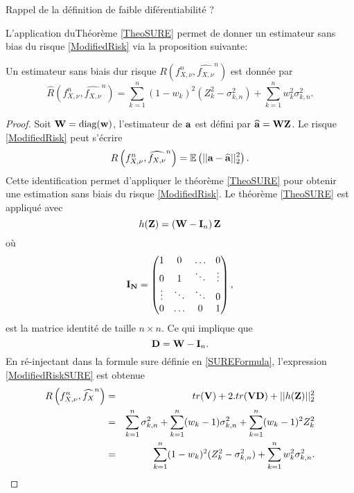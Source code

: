 \begin{Def}
Rappel de la définition de faible diférentiabilité ?
\end{Def}
L\rq{}application duThéorème \ref{TheoSURE} permet de donner un estimateur sans bias du risque \eqref{ModifiedRisk} via la proposition suivante:
\begin{Prop}\label{PropSURE}
Un estimateur sans biais dur risque $R\left(f_{X,\nu}^{n},\widehat{f_{X,\nu}}^{n} \right)$ est donnée par 
\begin{equation}\label{ModifiedRiskSURE}
\widehat{R}\left(f_{X,\nu}^{n},\widehat{f_{X,\nu}}^{n} \right)=\sum_{k=1}^{n}(1-w_{k})^{2}\left(Z_{k}^{2}-\sigma_{k,n}^{2}\right)+\sum_{k=1}^{n}w_{k}^{2}\sigma_{k,n}^{2}.
\end{equation}
\end{Prop}
\begin{proof}
Soit $\bold{W}=\text{diag}(\bold{w})$, l'estimateur de $\bold{a}$ est défini par $\widehat{\bold{a}}=\bold{W}\bold{Z}$. Le risque \eqref{ModifiedRisk} peut s'écrire
\begin{equation*}
R\left(f_{X,\nu}^{n},\widehat{f_{X,\nu}}^{n} \right)=\mathbb{E}\left(||\bold{a}-\widehat{\bold{a}}||_{2}^{2}\right).
\end{equation*}
Cette identification permet d'appliquer le théorème \ref{TheoSURE} pour obtenir une estimation sans biais du risque \eqref{ModifiedRisk}. Le théorème \ref{TheoSURE} est appliqué avec
\begin{equation*}\label{Fonctionh}
h(\bold{Z})=\left(\bold{W}-\bold{I}_{n}\right)\bold{Z}
\end{equation*}
où
\begin{equation*}\label{IdentityMatrix}
\bold{I_{N}}=\begin{pmatrix}
1&0&\hdots&0\\
0&1&\ddots&\vdots\\
\vdots&\ddots&\ddots&0\\
0&\hdots&0&1\\
 \end{pmatrix},
\end{equation*}
est la matrice identité de taille $n\times n$. Ce qui implique que 
\begin{equation*}
\bold{D}=\bold{W}-\bold{I}_{n}.
\end{equation*}  
En ré-injectant dans la formule \gls{sure} définie en \eqref{SUREFormula}, l'expression \eqref{ModifiedRiskSURE} est obtenue
\begin{eqnarray*}
R\left(f_{X,\nu}^{n},\widehat{f_{X}}^{n} \right)&=&tr(\bold{V})+2. tr(\bold{VD})+||h(\bold{Z})||_{2}^{2}\\
&=&\sum_{k=1}^{n}\sigma_{k,n}^{2}+\sum_{k=1}^{n}(w_{k}-1)\sigma_{k,n}^{2}+\sum_{k=1}^{n}(w_{k}-1)^{2}Z_{k}^{2}\\
&=&\sum_{k=1}^{n}(1-w_{k})^{2}(Z_{k}^{2}-\sigma_{k,n}^{2})+\sum_{k=1}^{n}w_{k}^{2}\sigma_{k,n}^{2}.
\end{eqnarray*}
\end{proof}
